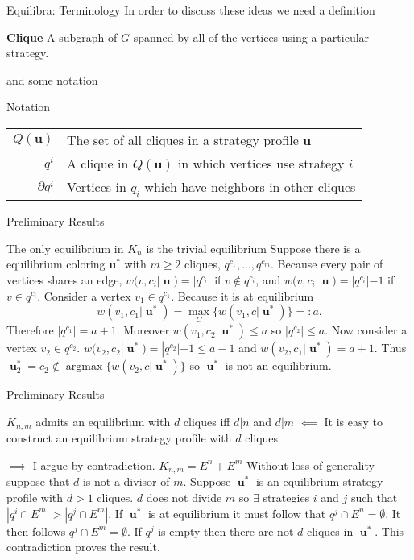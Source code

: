\documentclass{beamer}
\DeclareMathOperator*{\argmax}{\text{argmax}}
\DeclareMathOperator{\uu}{\mathbf{u}}
\begin{document}
\begin{frame}
	{Equilibra: Terminology} %
	In order to discuss these ideas we need a definition
	\begin{block}{\textbf{Clique}}
		A subgraph of $G$ spanned by all of the vertices using a particular strategy. 
	\end{block}  
	and some notation
	\begin{block}{Notation}
		\begin{tabular}{rp{9cm}} 
			$Q(\mathbf{u})$& The set of all cliques in a strategy profile $\mathbf{u}$ \\
			$q^i$& A clique in $Q(\mathbf{u})$ in which vertices use strategy $i$\\
			$\partial q^i$& Vertices in $q_i$ which have neighbors in other cliques\\
		\end{tabular}
	\end{block}
\end{frame} 	
\begin{frame}{Preliminary Results}
	\begin{block}{The only equilibrium in $K_n$ is the trivial equilibrium}
		Suppose there is a equilibrium coloring $\mathbf{u^*}$ with $m\geq2$ cliques, $q^{c_1},...,q^{c_m}$. Because every pair of vertices shares an edge, $w(v,c_i|\uu)=|q^{c_i}|$ if $v\notin q^{c_i}$, and $w(v,c_i|\uu)=|q^{c_i}|-1$ if $v\in q^{c_i}$.  Consider a vertex $v_1\in q^{c_1}$. Because it is at equilibrium $$w(v_1,c_1|\uu^*)=\max_C\{w(v_1,c|\uu^*)\}=:a.$$
		Therefore $|q^{c_1}|=a+1$. Moreover $w(v_1,c_2|\uu^*)\leq a$ so $|q^{c_2}|\leq a$.
		Now consider a vertex  $v_2\in q^{c_2}$. $w(v_2,c_2|\uu^*)=|q^{c_2}|-1\leq a-1$ and $w(v_2,c_1|\uu^*)=a+1$. 
		Thus $\uu^*_2=c_2\notin \argmax\{w(v_2,c|\uu^*)\}$ so $\uu^*$ is not an equilibrium.  
	\end{block}
\end{frame}

\begin{frame}{Preliminary Results}
	\begin{block}{$K_{n,m}$ admits an equilibrium with $d$ cliques iff $d|n$ and $d|m$}
		$\impliedby$ It is easy to construct an equilibrium strategy profile with $d$ cliques
		
		$\implies$ I argue by contradiction. $K_{n,m}=E^n+E^m$  Without loss of generality suppose that $d$ is not a divisor of $m$. Suppose $\uu^*$ is an equilibrium strategy profile with $d>1$ cliques. $d$ does not divide $m$ so $\exists$ strategies $i$ and $j$ such that $|q^i\cap E^m|>|q^j\cap E^m|$. If $\uu^*$ is at equilibrium it must follow that $q^j\cap E^n=\emptyset$. It then follows $q^j\cap E^m =\emptyset$. If $q^j$ is empty then there are not $d$ cliques in $\uu^*$. This contradiction proves the result.   
	\end{block}
\end{frame}
\end{document}
